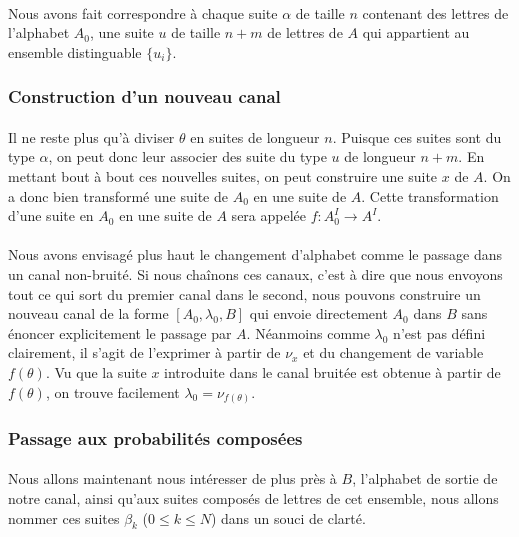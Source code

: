 	\paragraph{}
	Nous avons fait correspondre à chaque suite $\alpha$ de taille $n$ 
	contenant des lettres de l'alphabet $A_0$, une suite $u$ de taille
	$n+m$ de lettres de $A$ qui appartient au ensemble distinguable $\{u_i\}$. 
	
\subsubsection*{Construction d'un nouveau canal}
	
	\paragraph{}
	Il ne reste plus qu'à diviser $\theta$ en suites de longueur $n$. 
	Puisque ces suites sont du type $\alpha$, on peut donc leur 
	associer des suite du type $u$ de longueur $n+m$. En mettant bout à bout
	ces nouvelles suites, on peut construire une suite $x$ de $A$. 
	On a donc bien transformé une suite de $A_0$ en une suite de $A$. 
	Cette transformation d'une suite en $A_0$ en une suite de $A$ sera 
	appelée $f : A_0^I \to A^I$.
	
	\paragraph{}
	Nous avons envisagé plus haut le changement
	d'alphabet comme le passage dans un canal non-bruité. Si nous chaînons 
	ces canaux, c'est à dire que nous envoyons tout ce qui sort du premier 
	canal dans le second, nous pouvons construire un nouveau canal de la 
	forme $[A_0,\lambda_0,B]$ qui envoie directement $A_0$ dans $B$ 
	sans énoncer explicitement le passage par $A$. Néanmoins comme
	$\lambda_0$ n'est pas défini clairement, il s'agit de l'exprimer à partir 
	de $\nu_x$ et du changement de variable $f(\theta)$. 
	Vu que la suite $x$ introduite dans le canal bruitée est obtenue à 
	partir de $f(\theta)$, on trouve facilement $\lambda_0=\nu_{f(\theta)}$.
	
\subsubsection*{Passage aux probabilités composées}
	
	\paragraph{}
	Nous allons maintenant nous intéresser de plus près à $B$, l'alphabet 
	de sortie de notre canal, ainsi qu'aux suites composés de lettres de cet
	ensemble, nous allons nommer ces suites $\beta_k$ ($0 \le k \le N$) dans
	un souci de clarté.
	
